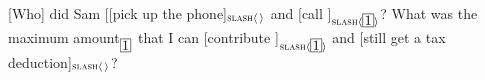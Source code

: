 {\begin{exe}
\begin{xlista}

\end{xlista}\label{cs1}
\end{exe}






\begin{exe}
\ex \begin{xlista}
\ex {}[Who] did Sam [[pick up the phone]$_{\textup{\textsc{slash}} \langle \, \rangle}$ and [call \trace]$_{\textup{\textsc{slash}} \langle \avmbox{1} \rangle}$?
\ex What was the maximum amount$_{\avmbox{1}}$ that
I can [contribute \trace]$_{\textup{\textsc{slash}} \langle \avmbox{1} \rangle}$ and [still get a tax deduction]$_{\textup{\textsc{slash}} \langle \, \rangle}$?
\end{xlista}\label{assym}
\end{exe}


}
